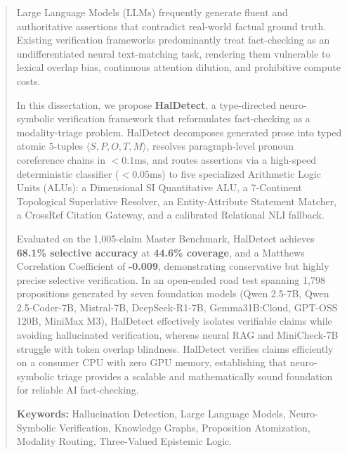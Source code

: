 \begin{abstract}
Large Language Models (LLMs) frequently generate fluent and authoritative assertions that contradict real-world factual ground truth. Existing verification frameworks predominantly treat fact-checking as an undifferentiated neural text-matching task, rendering them vulnerable to lexical overlap bias, continuous attention dilution, and prohibitive compute costs. 

In this dissertation, we propose \textbf{HalDetect}, a type-directed neuro-symbolic verification framework that reformulates fact-checking as a modality-triage problem. HalDetect decomposes generated prose into typed atomic 5-tuples $\langle S, P, O, T, M \rangle$, resolves paragraph-level pronoun coreference chains in $< 0.1\text{ms}$, and routes assertions via a high-speed deterministic classifier ($< 0.05\text{ms}$) to five specialized Arithmetic Logic Units (ALUs): a Dimensional SI Quantitative ALU, a 7-Continent Topological Superlative Resolver, an Entity-Attribute Statement Matcher, a CrossRef Citation Gateway, and a calibrated Relational NLI fallback.

Evaluated on the 1,005-claim Master Benchmark, HalDetect achieves \textbf{68.1\% selective accuracy} at \textbf{44.6\% coverage}, and a Matthews Correlation Coefficient of \textbf{-0.009}, demonstrating conservative but highly precise selective verification. In an open-ended road test spanning 1,798 propositions generated by seven foundation models (Qwen 2.5-7B, Qwen 2.5-Coder-7B, Mistral-7B, DeepSeek-R1-7B, Gemma31B:Cloud, GPT-OSS 120B, MiniMax M3), HalDetect effectively isolates verifiable claims while avoiding hallucinated verification, whereas neural RAG and MiniCheck-7B struggle with token overlap blindness. HalDetect verifies claims efficiently on a consumer CPU with zero GPU memory, establishing that neuro-symbolic triage provides a scalable and mathematically sound foundation for reliable AI fact-checking.

\vspace{1.5em}
\noindent\textbf{Keywords:} Hallucination Detection, Large Language Models, Neuro-Symbolic Verification, Knowledge Graphs, Proposition Atomization, Modality Routing, Three-Valued Epistemic Logic.
\end{abstract}
